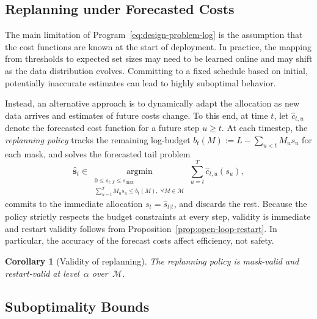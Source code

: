 \documentclass{uai2026} %
\newtheorem{corollary}[theorem]{Corollary}
\newcommand{\1}{\mathbf{1}}
\newcommand{\G}{\mathcal{G}}
\newcommand{\mcal}{\mathcal{M}}
\newcommand{\argmin}{\operatorname*{argmin}}
\begin{document}
\subsection{Replanning under Forecasted Costs}
\label{sec:replanning}

The main limitation of Program~\eqref{eq:design-problem-log} is the assumption that the cost functions are known at the start of deployment. In practice, the mapping from thresholds to expected set sizes may need to be learned online and may shift as the data distribution evolves. Committing to a fixed schedule based on initial, potentially inaccurate estimates can lead to highly suboptimal behavior.

Instead, an alternative approach is to dynamically adapt the allocation as new data arrives and estimates of future costs change. To this end, at time $t$, let $\hat{c}_{t,u}$ denote the forecasted cost function for a future step $u \ge t$.
At each timestep, the \emph{replanning policy} tracks the remaining log-budget $b_t(M) := L - \sum_{u < t} M_u s_u$ for each mask, and solves the forecasted tail problem
\begin{equation}
  \label{eq:replan-action}
  \hat{\bm{s}}_t \in \argmin_{\substack{0 \le s_{t:T} \le s_{\max}\\
  \sum_{u=t}^{T} M_u s_u \le b_t(M),\; \forall M \in \mcal}}
  \sum_{u=t}^{T} \hat{c}_{t,u}(s_u),
\end{equation}
commits to the immediate allocation $s_t = \hat{s}_{t|t}$, and discards the rest.
Because the policy strictly respects the budget constraints at every step, validity is immediate and restart validity follows from Proposition~\ref{prop:open-loop-restart}. In particular, the accuracy of the forecast costs affect efficiency, not safety.

\begin{corollary}[Validity of replanning]
  \label{cor:replan-validity}
  The replanning policy is mask-valid and restart-valid at level~$\alpha$ over~$\mcal$.
\end{corollary}
%

\subsection{Suboptimality Bounds}
\label{sec:suboptimality}
\end{document}
